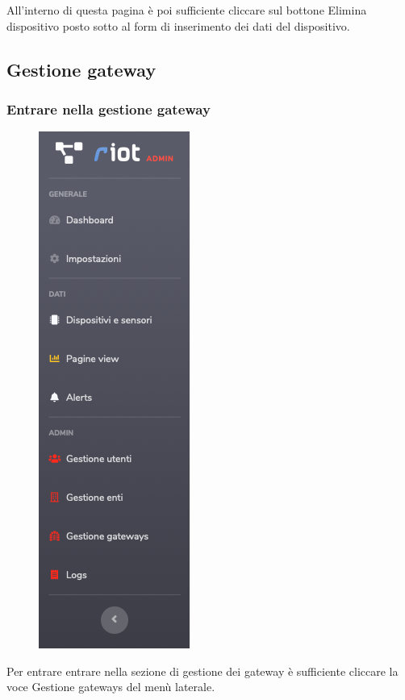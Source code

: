 		All'interno di questa pagina è poi sufficiente cliccare sul bottone Elimina dispositivo posto sotto al form di inserimento dei dati del dispositivo.

\subsection{Gestione gateway}

	\subsubsection{Entrare nella gestione gateway}

		\begin{figure}[H]
		\centering
		\includegraphics[scale=0.600]{res/images/admin/menuGateway.png}
		\caption{}
	\end{figure}

		Per entrare entrare nella sezione di gestione dei gateway è sufficiente cliccare la voce Gestione gateways del menù laterale.

